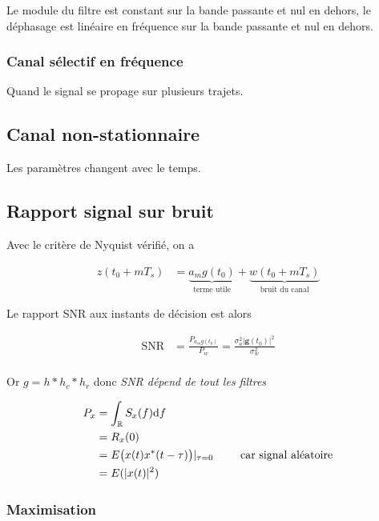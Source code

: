 \documentclass{article}
\begin{document}
Le module du filtre est constant sur la bande passante et nul en dehors, le déphasage est linéaire en fréquence sur la bande passante et nul en dehors.

\subsubsection{Canal sélectif en fréquence}

Quand le signal se propage sur plusieurs trajets.

\subsection{Canal non-stationnaire}
Les paramètres changent avec le temps.

\subsection{Rapport signal sur bruit}

Avec le critère de Nyquist vérifié, on a

\begin{align*}
    z(t_0 + mT_s) &= \underbrace{a_m g(t_0)}_{\text{terme utile}} + \underbrace{w(t_0 + mT_s)}_{\text{bruit du canal}}
\end{align*}

Le rapport SNR aux instants de décision est alors

\begin{align*}
    \text{SNR} &= \frac{P_{a_m g(t_0)}}{P_w} = \frac{\sigma_a^2 |\mathbf{g}(t_0)|^2}{\sigma_w^2} \\
\end{align*}

Or $g = h \ast h_c \ast h_r$ donc  \emph{SNR dépend de tout les filtres} 

\begin{align*}
    P_x &= \int_{\mathbb{R}} S_x(f) \mathrm{d}f \\
    &= R_x(0) \\
    &= E\big(x(t) x^\ast(t-\tau)\big) \Large|_{\tau=0} \quad&\text{car signal aléatoire} \\
    &= E(|x(t)|^2) \\
\end{align*}

\subsubsection{Maximisation}
\end{document}
